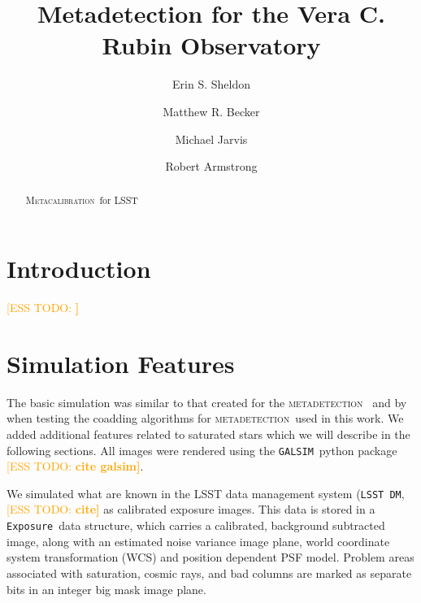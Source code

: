 \documentclass[iop, twocolappendix, appendixfloats, numberedappendix, apj]{hackemulateapj}
\newcommand{\esstodo}[1]{\textcolor{orange}{[ESS TODO: \bf #1]}}
\newcommand{\galsim}{\texttt{GALSIM}}
\newcommand{\calexp}{\texttt{Exposure}}
\newcommand{\dm}{\texttt{LSST DM}}
\newcommand{\mdet}{\textsc{metadetection}}
\newcommand{\Mcal}{\textsc{Metacalibration}}
\newcommand{\Mdet}{\textsc{Metadetection}}
\begin{document}



\title{Metadetection for the Vera C. Rubin Observatory}

\author{Erin S. Sheldon}
\author{Matthew R. Becker}
\author{Michael Jarvis}
\author{Robert Armstrong}


\begin{abstract}

    \Mcal\ for LSST

\end{abstract}


\section{Introduction} \label{sec:intro}

\esstodo{}

\section{Simulation Features} \label{sec:sim}

The basic simulation was similar to that created for the \mdet\ \citep{mdet20}
and by \citet{BeckerMdetCoadd} when testing the coadding algorithms for \mdet\ used
in this work. We added additional
features related to saturated stars which we will describe in the following
sections.  All images were rendered using the \galsim\ python package \esstodo{
cite galsim}.

We simulated what are known in the LSST data management system (\dm, \esstodo{cite}
as calibrated exposure images.  This data is stored in a \calexp\ data
structure, which carries a calibrated, background subtracted image, along with
an estimated noise variance image plane, world coordinate system transformation
(WCS) and position dependent PSF model.  Problem areas associated with
saturation, cosmic rays, and bad columns are marked as separate bits in an
integer big mask image plane.
\end{document}
